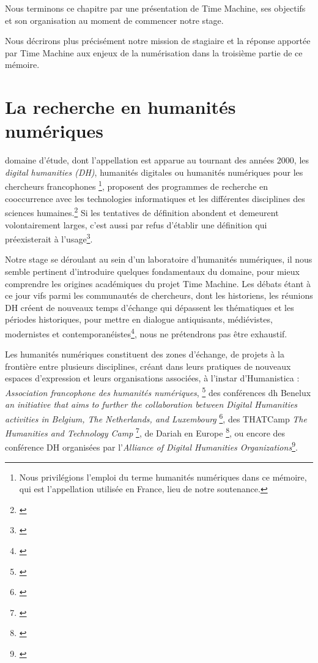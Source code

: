 Nous terminons ce chapitre par une présentation de Time Machine, ses objectifs et  son organisation au moment de commencer notre stage.

Nous décrirons plus précisément notre mission de stagiaire et la réponse apportée par Time Machine aux enjeux de la numérisation dans la troisième partie de ce mémoire.

\section{La recherche en humanités numériques} 
 domaine d'étude, dont l'appellation est apparue au tournant des années 2000, les \textit{digital humanities (DH)}, humanités digitales ou humanités numériques pour les chercheurs francophones \footnote{Nous privilégions l'emploi du terme humanités numériques dans ce mémoire, qui est l'appellation utilisée en France, lieu de notre soutenance.}, proposent des programmes de recherche en cooccurrence avec les technologies informatiques et les différentes disciplines des sciences humaines.\footnote{\cite[p. 2]{meunier_paradoxe_2019}} Si les tentatives de définition abondent et demeurent volontairement larges, c'est aussi par refus d'établir \og une définition qui préexisterait à l'usage\fg{}\footnote{\cite[p. 2]{caraco_les_2012}}. 

Notre stage se déroulant au sein d'un laboratoire d'humanités numériques, il nous semble pertinent d'introduire quelques fondamentaux du domaine, pour mieux comprendre les origines académiques du projet Time Machine. Les débats étant à ce jour vifs parmi les communautés de chercheurs, dont les historiens, \og les réunions DH créent de nouveaux temps d'échange qui dépassent les thématiques et les périodes historiques, pour mettre en dialogue antiquisants, médiévistes, modernistes et contemporanéistes\fg{}\footnote{\cite[p. 5]{clavert_les_2019}}, nous ne prétendrons pas être exhaustif. 

Les humanités numériques constituent des zones d'échange, de projets à la frontière entre plusieurs disciplines, créant dans leurs pratiques de nouveaux espaces d'expression et leurs organisations associées, à l'instar d'Humanistica :  \textit{Association francophone des humanités numériques}, \footnote{\cite{association_francophone_des_humanites_numeriques_humanistica_nodate}} des conférences \gls{dh} Benelux \textit{\og an initiative that aims to further the collaboration between Digital Humanities activities in Belgium, The Netherlands, and Luxembourg \fg}{}\footnote{\cite{dhbenelux_2019_dhbenelux_nodate}}, des THATCamp \textit{\og The Humanities and Technology Camp \fg}{}\footnote{\cite{thatcamp_humanities_nodate}}, de Dariah en Europe \textit{}\footnote{\cite{dariah_digital_nodate}}, ou encore des conférence DH organisées par l'\textit{\og Alliance of Digital Humanities Organizations\fg}{}\footnote{\cite{alliance_of_digital_humanities_organizations_about_nodate}}.

